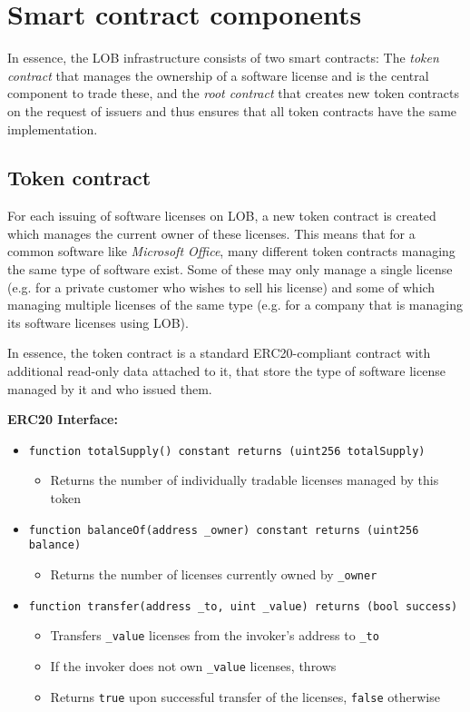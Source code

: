 \documentclass[a4paper]{article}
\begin{document}
\section{Smart contract components}

In essence, the LOB infrastructure consists of two smart contracts: The \emph{token contract} that manages the ownership of a software license and is the central component to trade these, and the \emph{root contract} that creates new token contracts on the request of issuers and thus ensures that all token contracts have the same implementation.

\subsection{Token contract}

For each issuing of software licenses on LOB, a new token contract is created which manages the current owner of these licenses. This means that for a common software like \emph{Microsoft Office}, many different token contracts managing the same type of software exist. Some of these may only manage a single license (e.g. for a private customer who wishes to sell his license) and some of which managing multiple licenses of the same type (e.g. for a company that is managing its software licenses using LOB).

In essence, the token contract is a standard ERC20-compliant contract \cite{erc20} with additional read-only data attached to it, that store the type of software license managed by it and who issued them.

\vspace{3mm}
\textbf{ERC20 Interface:}

\begin{itemize}
  \item \texttt{function totalSupply() constant returns (uint256 totalSupply)}
  \begin{itemize}
    \item Returns the number of individually tradable licenses managed by this token
  \end{itemize}
    
  \item \texttt{function balanceOf(address \_owner) constant returns (uint256 balance)}
  \begin{itemize}
    \item Returns the number of licenses currently owned by \texttt{\_owner}
  \end{itemize}
  
  \item \texttt{function transfer(address \_to, uint \_value) returns (bool success)}
  \begin{itemize}
    \item Transfers \texttt{\_value} licenses from the invoker's address to \texttt{\_to}
    \item If the invoker does not own \texttt{\_value} licenses, throws
    \item Returns \texttt{true} upon successful transfer of the licenses, \texttt{false} otherwise
  \end{itemize}
\end{itemize}
\end{document}
